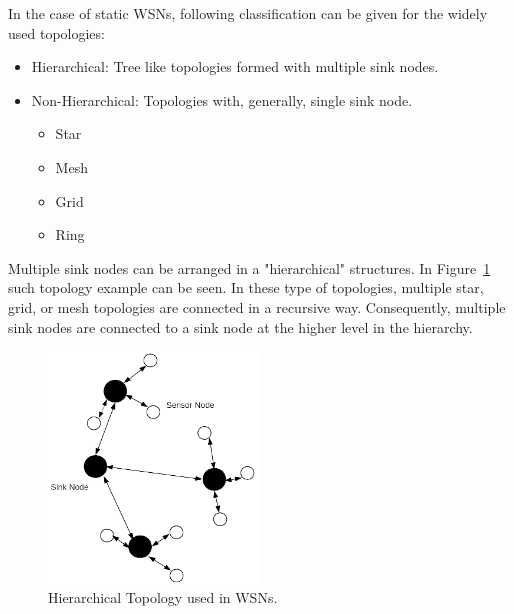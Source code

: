 \documentclass[12pt, oneandhalf, chaparabic, sees, ms]{metu}
\begin{document}
In the case of static WSNs, following classification can be given for the widely used topologies:
\begin{itemize}
\item Hierarchical: Tree like topologies formed with multiple sink nodes.
\item Non-Hierarchical: Topologies with, generally, single sink node.
\begin{itemize}
\item Star
\item Mesh
\item Grid
\item Ring
\end{itemize}
\end{itemize}

Multiple sink nodes can be arranged in a "hierarchical" structures. In Figure~\ref{fig:mesh2} such topology example can be seen. In these type of topologies, 
multiple star, grid, or mesh topologies are connected in a recursive way. Consequently, multiple sink nodes are connected to a sink node at the higher level in the
hierarchy. 
% 
%
% 
\begin{figure}[!htbp]
\begin{center}
  \includegraphics[width=0.5\textwidth]{mesh2.png}
   \end{center}
  \caption{Hierarchical Topology used in WSNs.}
 \label{fig:mesh2}
\end{figure}
% 
%
% 
% 
\end{document}
